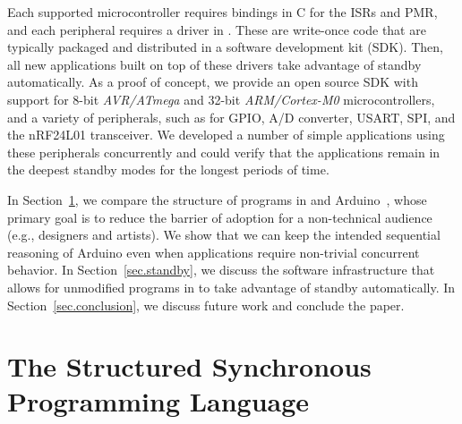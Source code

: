 Each supported microcontroller requires bindings in C for the ISRs and PMR, and
each peripheral requires a driver in \CEU.
These are write-once code that are typically packaged and distributed in a
software development kit (SDK).
%
Then, all new applications built on top of these drivers take advantage of
standby automatically.
%
As a proof of concept, we provide an open source SDK %
with support for 8-bit
\emph{AVR/ATmega} and 32-bit \emph{ARM/Cortex-M0} microcontrollers, and a
variety of peripherals, such as for GPIO, A/D converter, USART, SPI, and the
nRF24L01 transceiver.
%
We developed a number of simple applications using these peripherals
concurrently and could verify that the applications remain in the deepest
standby modes for the longest periods of time.

In Section~\ref{sec.ceu}, we compare the structure of programs in \CEU and
Arduino~\cite{arduino.book}, whose primary goal is to reduce the barrier of
adoption for a non-technical audience (e.g., designers and artists).
We show that we can keep the intended sequential reasoning of Arduino even when
applications require non-trivial concurrent behavior.
%
In Section~\ref{sec.standby}, we discuss the software infrastructure that
allows for unmodified programs in \CEU to take advantage of standby
automatically.
%
In Section~\ref{sec.conclusion}, we discuss future work and conclude the paper.



\section{The Structured Synchronous Programming Language \CEU}
\label{sec.ceu}

